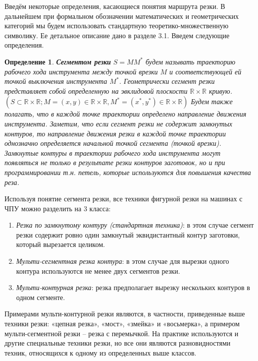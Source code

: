 \documentclass[12pt,twoside]{report}
\newcounter{theo}
\newcounter{pred}
\newcounter{opred}
\newtheorem{opred}{Определение}[section]
\begin{document}
Введём некоторые определения,
касающиеся понятия маршрута резки.
В дальнейшем при формальном обозначении
математических и геометрических категорий
мы будем использовать стандартную
теоретико-множественную символику.
Ее детальное описание дано в разделе 3.1.
Введем следующие определения.

\begin{opred}
\label{Opred1}
{\bf Сегментом резки}
$S=MM^*$
будем называть траекторию рабочего хода
инструмента между точкой врезки
$M$
и соответствующей ей точкой выключения инструмента
$M^*$.
Геометрически сегмент резки представляет собой
определенную на эвклидовой плоскости
$\mathbb R \times \mathbb R$
кривую.
$(S \subset \mathbb R \times \mathbb R;
M=(x,y) \in \mathbb R \times \mathbb R,
M^* =(x^*,y^*)\in \mathbb R \times \mathbb R)$
Будем также полагать,
что в каждой точке траектории определено направление движения инструмента.
Заметим, что если сегмент резки не содержит замкнутых контуров,
то направление движения резки в каждой точке траектории
однозначно определяется начальной точкой сегмента
(точкой врезки).
Замкнутые контуры в траектории рабочего хода инструмента
могут появляться не только в результате резки контуров заготовок,
но и при программировании т.н. петель,
которые используются для повышения качества реза.
\end{opred}

Используя понятие сегмента резки,
все техники фигурной резки на машинах с ЧПУ
можно разделить на 3 класса:
\begin{enumerate}
  \item
  {\it Резка по замкнутому контуру (стандартная техника)}:
  в этом случае сегмент резки содержит
  ровно один замкнутый эквидистантный контур заготовки,
  который вырезается целиком.
  \item
  {\it Мульти-сегментная резка контура}:
  в этом случае для вырезки одного контура
  используются не менее двух сегментов резки.
  \item
  {\it Мульти-контурная резка}:
  резка предполагает вырезку нескольких
  контуров в одном сегменте.
\end{enumerate}

Примерами мульти-контурной резки являются,
в частности, приведенные выше техники резки:
«цепная резка», «мост», «змейка» и «восьмерка»,
а примером мульти-сегментной резки –
резка с перемычкой.
На практике используются и другие специальные техники резки,
но все они являются разновидностями техник,
относящихся к одному из определенных выше классов.
\end{document}
